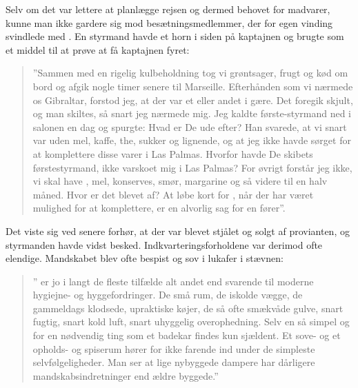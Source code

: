 Selv om det var lettere at planlægge rejsen og dermed behovet for
madvarer,
kunne man ikke gardere sig mod besætningsmedlemmer, der for egen vinding
svindlede med . En styrmand havde et horn i siden på kaptajnen
og brugte  som et middel til at prøve at få kaptajnen fyret:

\begin{quote}
    
    ''Sammen med en rigelig kulbeholdning tog vi grøntsager, frugt og kød
    om bord og afgik nogle timer senere til Marseille. Efterhånden som vi
    nærmede os Gibraltar, forstod jeg, at der var et eller andet i gære.
    Det foregik skjult, og man skiltes, så snart jeg nærmede mig. Jeg
    kaldte første-styrmand ned i salonen en dag og spurgte: Hvad er De
    ude efter?  Han svarede, at vi snart var uden mel, kaffe, the, sukker
    og lignende, og at jeg ikke havde sørget for at komplettere disse
    varer i Las Palmas.  Hvorfor havde De skibets førstestyrmand, ikke
    varskoet mig i Las Palmas?  For øvrigt forstår jeg ikke, vi skal have
    , mel, konserves, smør, margarine og så videre til en
    halv måned. Hvor er det blevet af?  At løbe kort for ,
    når der har været mulighed for at komplettere, er en alvorlig sag for
    en fører''. 

\end{quote}

Det viste sig ved senere forhør, at der var blevet stjålet og solgt af
provianten, og styrmanden havde vidst besked. Indkvarteringsforholdene
var derimod ofte elendige.  Mandskabet blev ofte bespist og sov i lukafer
i stævnen: 

\begin{quote}
    
    '' er jo i langt de fleste tilfælde alt andet end svarende
    til moderne hygiejne- og hyggefordringer. De små rum, de iskolde
    vægge, de gammeldags klodsede, upraktiske køjer, de så ofte smækvåde
    gulve, snart fugtig, snart kold luft, snart uhyggelig overophedning.
    Selv en så simpel og for en  nødvendig ting som et badekar
    findes kun sjældent. Et sove- og et opholds- og spiserum hører for
    ikke farende ind under de simpleste selvfølgeligheder. Man ser at
    lige nybyggede dampere har dårligere mandskabsindretninger end ældre
    byggede.''

\end{quote}


